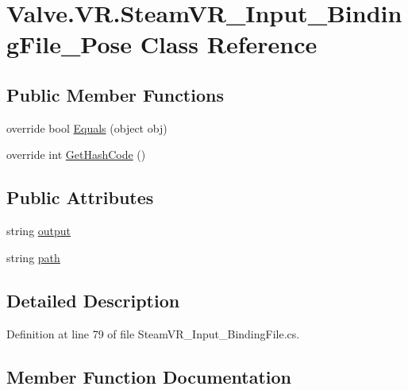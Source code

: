 \hypertarget{class_valve_1_1_v_r_1_1_steam_v_r___input___binding_file___pose}{}\section{Valve.\+V\+R.\+Steam\+V\+R\+\_\+\+Input\+\_\+\+Binding\+File\+\_\+\+Pose Class Reference}
\label{class_valve_1_1_v_r_1_1_steam_v_r___input___binding_file___pose}
\subsection*{Public Member Functions}
\begin{DoxyCompactItemize}
\item 
override bool \mbox{\hyperlink{class_valve_1_1_v_r_1_1_steam_v_r___input___binding_file___pose_af7589dfd51c47b23c4180d53c6ae348d}{Equals}} (object obj)
\item 
override int \mbox{\hyperlink{class_valve_1_1_v_r_1_1_steam_v_r___input___binding_file___pose_a1549f51c18e7ec8a554211a6572ca9f3}{Get\+Hash\+Code}} ()
\end{DoxyCompactItemize}
\subsection*{Public Attributes}
\begin{DoxyCompactItemize}
\item 
string \mbox{\hyperlink{class_valve_1_1_v_r_1_1_steam_v_r___input___binding_file___pose_ad42251a952549a7d19b6efa3f8acb342}{output}}
\item 
string \mbox{\hyperlink{class_valve_1_1_v_r_1_1_steam_v_r___input___binding_file___pose_adb574247e804d4580ab5c9316d91892a}{path}}
\end{DoxyCompactItemize}


\subsection{Detailed Description}


Definition at line 79 of file Steam\+V\+R\+\_\+\+Input\+\_\+\+Binding\+File.\+cs.



\subsection{Member Function Documentation}
\mbox{\label{class_valve_1_1_v_r_1_1_steam_v_r___input___binding_file___pose_af7589dfd51c47b23c4180d53c6ae348d}} 
